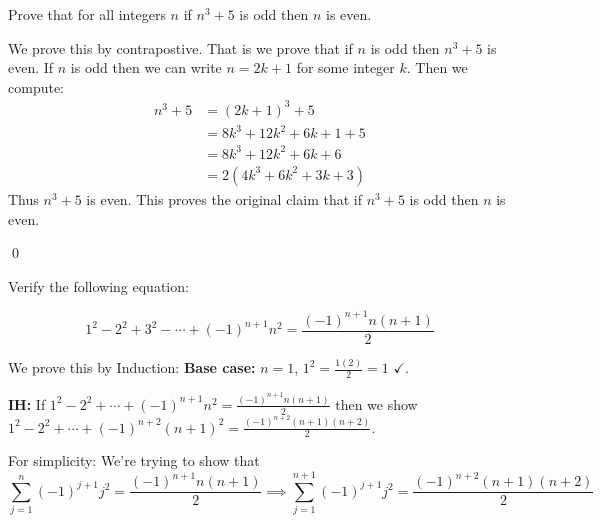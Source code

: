 \documentclass[addpoints,answers]{exam}
\begin{document}
\begin{questions}
  \question[4] Prove that for all integers $n$ if $n^3 + 5$ is odd then $n$ is even.
  \vspace*{\fill}
  \begin{solution}
    We prove this by contrapostive. That is we prove that if $n$ is odd then $n^3 + 5$ is even. If $n$ is odd then we can write $n = 2k+1$ for some integer $k$. Then we compute:
    \begin{align*}
      n^3 + 5 &= (2k+1)^3 + 5\\
      &= 8k^3 + 12k^2 + 6k + 1 + 5\\
      &= 8k^3 + 12k^2 + 6k + 6\\
      &= 2(4k^3 + 6k^2 + 3k + 3)
    \end{align*}
    Thus $n^3 + 5$ is even. This proves the original claim that if $n^3+5$ is odd then $n$ is even.

    \qed
  \end{solution}

  \question[8] Verify the following equation:

    \[
      1^2 - 2^2 + 3^2 - \cdots + (-1)^{n+1}n^2 = \frac{(-1)^{n+1} n (n+1)}{2}
    \]
    \vspace*{\fill}
    \begin{solution}
      We prove this by Induction: \textbf{Base case:} $n = 1$, $1^2 = \frac{1(2)}2 = 1$ $\checkmark$.

      \textbf{IH:} If $1^2 - 2^2 + \cdots + (-1)^{n+1}n^2 = \frac{(-1)^{n+1}n (n+1)}2$ then we show $1^2 - 2^2 + \cdots + (-1)^{n+2}(n+1)^2 = \frac{(-1)^{n+2}(n+1)(n+2)}2$.

      For simplicity: We're trying to show that 
      \[
        \sum_{j=1}^n (-1)^{j+1}j^2 = \frac{(-1)^{n+1} n (n+1)}{2} \implies \sum_{j=1}^{n+1} (-1)^{j+1}j^2 = \frac{(-1)^{n+2} (n+1)(n+2)}{2}
      \]


\end{solution}
\end{questions}
\end{document}
